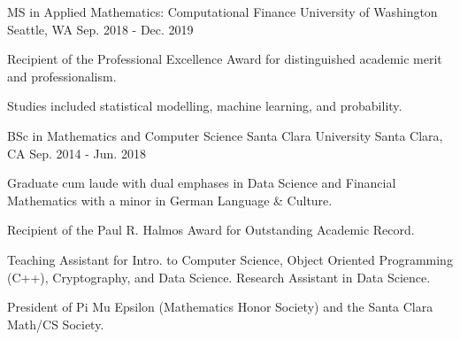 

\begin{cventries}

  \cventry
    {MS in Applied Mathematics: Computational Finance} %
    {University of Washington} %
    {Seattle, WA} %
    {Sep. 2018 - Dec. 2019} %
    {
      \begin{cvitems} %
        \item {Recipient of the Professional Excellence Award for distinguished academic merit and professionalism.}
        \item {Studies included statistical modelling, machine learning, and probability.}
      \end{cvitems}
    }

  \cventry
    {BSc in Mathematics and Computer Science} %
    {Santa Clara University} %
    {Santa Clara, CA} %
    {Sep. 2014 - Jun. 2018} %
    {
      \begin{cvitems} %
        \item {Graduate cum laude with dual emphases in Data Science and Financial Mathematics with a minor in German Language \& Culture.}
        \item {Recipient of the Paul R. Halmos Award for Outstanding Academic Record.}
        \item {Teaching Assistant for Intro. to Computer Science, Object Oriented Programming (C++), Cryptography, and Data Science. Research Assistant in Data Science.}
        \item {President of Pi Mu Epsilon (Mathematics Honor Society) and the Santa Clara Math/CS Society.}
      \end{cvitems}
    }

\end{cventries}
